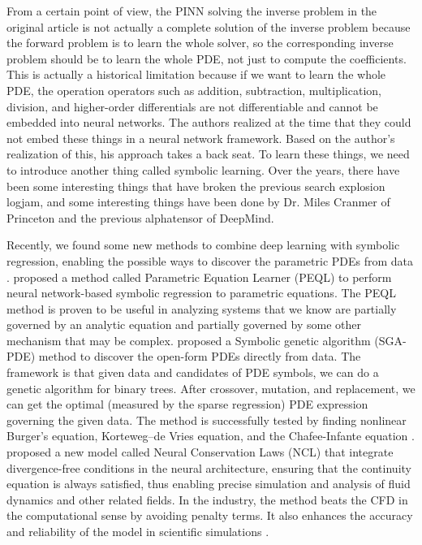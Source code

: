 \documentclass[12pt]{article}
\begin{document}
From a certain point of view, the PINN solving the inverse problem in the original article is not actually a complete solution of the inverse problem because the forward problem is to learn the whole solver, so the corresponding inverse problem should be to learn the whole PDE, not just to compute the coefficients. This is actually a historical limitation because if we want to learn the whole PDE, the operation operators such as addition, subtraction, multiplication, division, and higher-order differentials are not differentiable and cannot be embedded into neural networks. The authors realized at the time that they could not embed these things in a neural network framework. Based on the author's realization of this, his approach takes a back seat. To learn these things, we need to introduce another thing called symbolic learning. Over the years, there have been some interesting things that have broken the previous search explosion logjam, and some interesting things have been done by Dr. Miles Cranmer of Princeton and the previous alphatensor of DeepMind. 


Recently, we found some new methods to combine deep learning with symbolic regression, enabling the possible ways to discover the parametric PDEs from data \citep{Zhang2022DeepLA}. \citet{Zhang2022DeepLA} proposed a method called Parametric Equation Learner (PEQL) to perform neural network-based symbolic regression to parametric equations. The PEQL method is proven to be useful in analyzing systems that we know are partially governed by an analytic equation and partially governed by some other mechanism that may be complex. \citet{PhysRevResearch.4.023174} proposed a Symbolic genetic algorithm (SGA-PDE) method to discover the open-form PDEs directly from data. The framework is that given data and candidates of PDE symbols, we can do a genetic algorithm for binary trees. After crossover, mutation, and replacement, we can get the optimal (measured by the sparse regression) PDE expression governing the given data. The method is successfully tested by finding nonlinear Burger's equation, Korteweg–de Vries equation, and the Chafee-Infante equation \citep{PhysRevResearch.4.023174}. \citet{richterpowell2022neural} proposed a new model called Neural Conservation Laws (NCL) that integrate divergence-free conditions in the neural architecture, ensuring that the continuity equation is always satisfied, thus enabling precise simulation and analysis of fluid dynamics and other related fields. In the industry, the method beats the CFD in the computational sense by avoiding penalty terms. It also enhances the accuracy and reliability of the model in scientific simulations \citep{richterpowell2022neural}.
\end{document}
